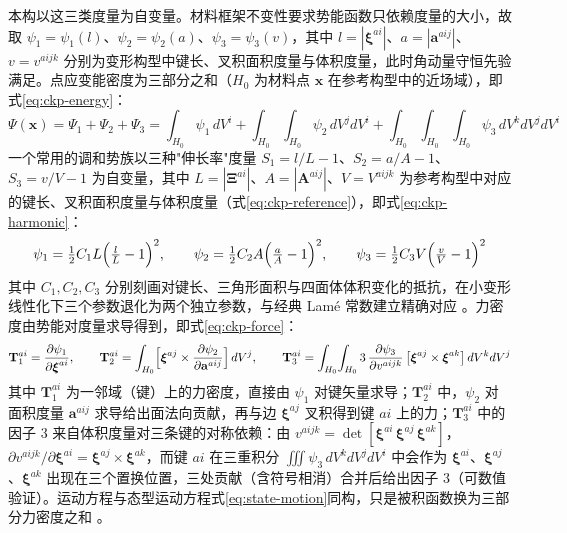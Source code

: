 本构以这三类度量为自变量。材料框架不变性要求势能函数只依赖度量的大小，故取 $\psi_1=\psi_1(l)$、$\psi_2=\psi_2(a)$、$\psi_3=\psi_3(v)$，其中 $l=|\boldsymbol{\xi}^{ai}|$、$a=|\mathbf{a}^{aij}|$、$v=v^{aijk}$ 分别为变形构型中键长、叉积面积度量与体积度量，此时角动量守恒先验满足。点应变能密度为三部分之和（$H_{0}$ 为材料点 $\mathbf{x}$ 在参考构型中的近场域），即式\eqref{eq:ckp-energy}：
\begin{equation}
  \Psi(\mathbf{x})=\Psi_1+\Psi_2+\Psi_3
  =\int_{H_0}\psi_1\,dV^{i}
  +\int_{H_0}\!\int_{H_0}\psi_2\,dV^{j}dV^{i}
  +\int_{H_0}\!\int_{H_0}\!\int_{H_0}\psi_3\,dV^{k}dV^{j}dV^{i}
  \label{eq:ckp-energy}
\end{equation}
一个常用的调和势族以三种"伸长率"度量 $S_1=l/L-1$、$S_2=a/A-1$、$S_3=v/V-1$ 为自变量，其中 $L=|\boldsymbol{\Xi}^{ai}|$、$A=|\mathbf{A}^{aij}|$、$V=V^{aijk}$ 为参考构型中对应的键长、叉积面积度量与体积度量（式\eqref{eq:ckp-reference}），即式\eqref{eq:ckp-harmonic}：
\begin{equation}
  \psi_1=\tfrac{1}{2}C_1L\Bigl(\tfrac{l}{L}-1\Bigr)^{2},\qquad
  \psi_2=\tfrac{1}{2}C_2A\Bigl(\tfrac{a}{A}-1\Bigr)^{2},\qquad
  \psi_3=\tfrac{1}{2}C_3V\Bigl(\tfrac{v}{V}-1\Bigr)^{2}
  \label{eq:ckp-harmonic}
\end{equation}
其中 $C_1,C_2,C_3$ 分别刻画对键长、三角形面积与四面体体积变化的抵抗，在小变形线性化下三个参数退化为两个独立参数，与经典 Lamé 常数建立精确对应 \cite{Javili2019}。力密度由势能对度量求导得到，即式\eqref{eq:ckp-force}：
\begin{equation}
  \mathbf{T}_1^{ai}=\frac{\partial\psi_1}{\partial\boldsymbol{\xi}^{ai}},\qquad
  \mathbf{T}_2^{ai}=\int_{H_0}\Bigl[\boldsymbol{\xi}^{aj}\times\frac{\partial\psi_2}{\partial\mathbf{a}^{aij}}\Bigr]\,dV^{j},\qquad
  \mathbf{T}_3^{ai}=\int_{H_0}\!\int_{H_0}3\,\frac{\partial\psi_3}{\partial v^{aijk}}\,
  \bigl[\boldsymbol{\xi}^{aj}\times\boldsymbol{\xi}^{ak}\bigr]\,dV^{k}dV^{j}
  \label{eq:ckp-force}
\end{equation}
其中 $\mathbf{T}_1^{ai}$ 为一邻域（键）上的力密度，直接由 $\psi_1$ 对键矢量求导；$\mathbf{T}_2^{ai}$ 中，$\psi_2$ 对面积度量 $\mathbf{a}^{aij}$ 求导给出面法向贡献，再与边 $\boldsymbol{\xi}^{aj}$ 叉积得到键 $ai$ 上的力；$\mathbf{T}_3^{ai}$ 中的因子 $3$ 来自体积度量对三条键的对称依赖：由 $v^{aijk}=\det[\boldsymbol{\xi}^{ai}\,\boldsymbol{\xi}^{aj}\,\boldsymbol{\xi}^{ak}]$，$\partial v^{aijk}/\partial\boldsymbol{\xi}^{ai}=\boldsymbol{\xi}^{aj}\times\boldsymbol{\xi}^{ak}$，而键 $ai$ 在三重积分 $\iiint\psi_3\,dV^{k}dV^{j}dV^{i}$ 中会作为 $\boldsymbol{\xi}^{ai}$、$\boldsymbol{\xi}^{aj}$、$\boldsymbol{\xi}^{ak}$ 出现在三个置换位置，三处贡献（含符号相消）合并后给出因子 $3$（可数值验证）。运动方程与态型运动方程式\eqref{eq:state-motion}同构，只是被积函数换为三部分力密度之和 \cite{Javili2019}。

